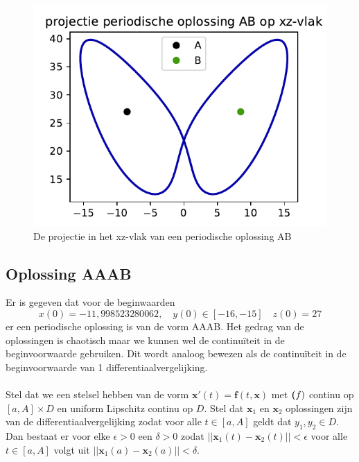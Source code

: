 \documentclass[12pt, a4paper]{article}
\newcommand{\x}{\textbf{x}}
\theoremstyle{definition}
\begin{document}
\begin{figure}[H]
    \centering
    \includegraphics[width=0.5\linewidth]{projectie_opdracht_3.pdf}
    \caption{De projectie in het xz-vlak van een periodische oplossing AB}
    \label{fig: AB}
\end{figure}

\subsection{Oplossing AAAB}
Er is gegeven dat voor de beginwaarden
\begin{equation}
x(0) =−11, 998 523 280 062, \quad y(0) \in [-16, -15] \quad   z(0) = 27
\label{eq: AAAB-x0}
\end{equation}
er een periodische oplossing is van de vorm AAAB. Het gedrag van de oplossingen is chaotisch maar we kunnen wel de continuïteit in de beginvoorwaarde gebruiken. Dit wordt analoog bewezen als de continuïteit in de beginvoorwaarde van 1 differentiaalvergelijking.\\
\\
Stel dat we een stelsel hebben van de vorm $\textbf{x}'(t) = \textbf{f}(t, \textbf{x})$ met $\textbf(f)$ continu op $[a, A] \times D$ en uniform Lipschitz continu op $D$. Stel dat $\textbf{x}_1$ en $\textbf{x}_2$ oplossingen zijn van de differentiaalvergelijking zodat voor alle $t \in [a, A]$ geldt dat $y_1, y_2 \in D$. Dan bestaat er voor elke $\epsilon > 0$ een $\delta > 0$ zodat $||\x_1(t)-\x_2(t)|| < \epsilon$ voor alle $t \in [a, A]$ volgt uit $||\x_1(a)-\x_2(a)|| < \delta$.
\end{document}
